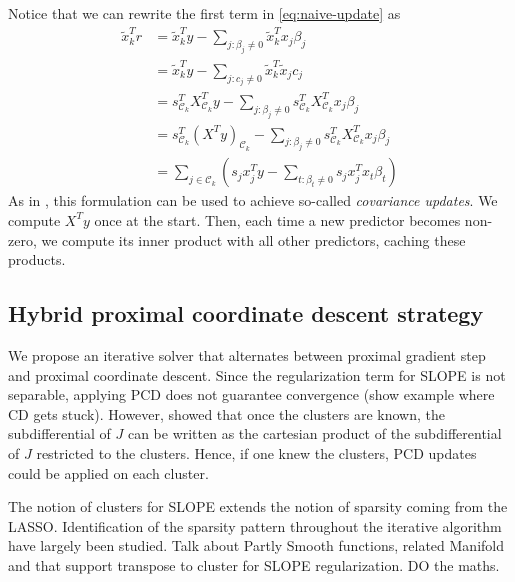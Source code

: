 Notice that we can rewrite the first term in \eqref{eq:naive-update} as
\begin{equation}
  \begin{aligned}
    \tilde x_k^T r & = \tilde x_k^T y - \sum_{j : \beta_j \neq 0} \tilde x_k^T x_j \beta_j                                                                    \\
                   & = \tilde x_k^T y - \sum_{j : c_j \neq 0} \tilde x_k^T \tilde x_j c_j                                                                     \\
                   & = s_{\mathcal{C}_k}^T X_{\mathcal{C}_k}^T y - \sum_{j : \beta_j \neq 0} s_{\mathcal{C}_k}^T X_{\mathcal{C}_k}^T x_j \beta_j              \\
                   & = s_{\mathcal{C}_k}^T \left(X^T y\right)_{\mathcal{C}_k} - \sum_{j : \beta_j \neq 0} s_{\mathcal{C}_k}^T X_{\mathcal{C}_k}^T x_j \beta_j \\
                   & = \sum_{j \in \mathcal{C}_k}\left( s_j x_j^Ty - \sum_{t : \beta_t \neq 0} s_j x_j^T x_t \beta_t \right)
  \end{aligned}
\end{equation}
As in \textcite{friedman2010}, this formulation can be used to achieve so-called \emph{covariance updates}.
We compute \(X^T y\) once at the start.
Then, each time a new predictor becomes non-zero, we compute its inner product with all other predictors, caching these products.

\subsection{Hybrid proximal coordinate descent strategy}

We propose an iterative solver that alternates between proximal gradient step and proximal coordinate descent.
Since the regularization term for SLOPE is not separable, applying PCD does not guarantee convergence (show example where CD gets stuck).
However, \cite{dupuis2021} showed that once the clusters are known, the subdifferential of $J$ can be written as the cartesian product of the subdifferential of $J$ restricted to the clusters.
Hence, if one knew the clusters, PCD updates could be applied on each cluster.

The notion of clusters for SLOPE extends the notion of sparsity coming from the LASSO.
Identification of the sparsity pattern throughout the iterative algorithm have largely been studied.
Talk about Partly Smooth functions, related Manifold and that support transpose to cluster for SLOPE regularization. DO the maths.

